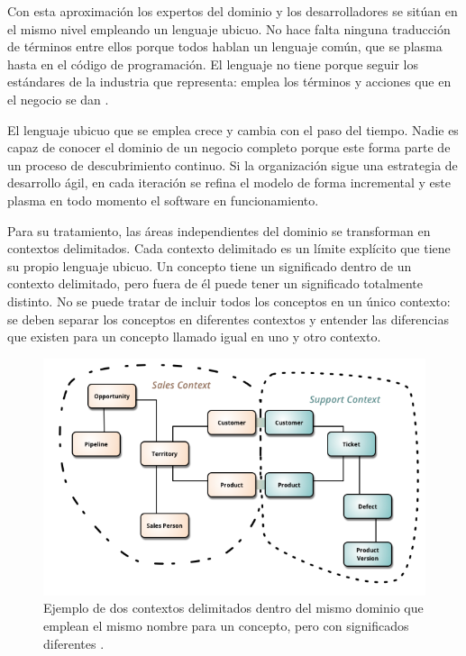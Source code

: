 \documentclass[11pt,spanish,listoffigures]{tfgetsinf}
\begin{document}
Con esta aproximación los expertos del dominio y los desarrolladores se sitúan en el mismo nivel empleando un lenguaje ubicuo. No hace falta ninguna traducción de términos entre ellos porque todos hablan un lenguaje común, que se plasma hasta en el código de programación. El lenguaje no tiene porque seguir los estándares de la industria que representa: emplea los términos y acciones que en el negocio se dan \cite{Vaughn2013}.

El lenguaje ubicuo que se emplea crece y cambia con el paso del tiempo. Nadie es capaz de conocer el dominio de un negocio completo porque este forma parte de un proceso de descubrimiento continuo. Si la organización sigue una estrategia de desarrollo ágil, en cada iteración se refina el modelo de forma incremental y este plasma en todo momento el software en funcionamiento.

Para su tratamiento, las áreas independientes del dominio se transforman en contextos delimitados. Cada contexto delimitado es un límite explícito que tiene su propio lenguaje ubicuo. Un concepto tiene un significado dentro de un contexto delimitado, pero fuera de él puede tener un significado totalmente distinto. No se puede tratar de incluir todos los conceptos en un único contexto: se deben separar los conceptos en diferentes contextos y entender las diferencias que existen para un concepto llamado igual en uno y otro contexto.

\begin{figure}[h]
\centering
\includegraphics[scale=0.8]{bounded_contexts}
\caption{Ejemplo de dos contextos delimitados dentro del mismo dominio que emplean el mismo nombre para un concepto, pero con significados diferentes \cite{Fowler}.}
\label{fig:BoundedContexts}
\end{figure}
\end{document}
